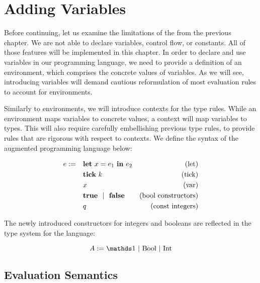 \chapter{Adding Variables}

Before continuing, let us examine the limitations of the  from the previous chapter. We are not able to declare variables, control flow, or constants. All of those features will be implemented in this chapter. In order to declare and use variables in our programming language, we need to provide a definition of an environment, which comprises the concrete values of variables. As we will see, introducing variables will demand cautious reformulation of most evaluation rules to account for environments.

Similarly to environments, we will introduce contexts for the type rules. While an environment maps variables to concrete values, a context will map variables to types. This will also require carefully embellishing previous type rules, to provide rules that are rigorous with respect to contexts. We define the syntax of the augmented programming language below:


\begin{definition}
   \label{def:prog-lang-5}

\begin{align*}
   e := ~~~ & \mathbf{let}~x = e_1~\mathbf{in}~e_2		& \text{(let)}\\
            & \mathbf{tick}~k				& \text{(tick)}\\
	    & x					& \text{(var)}\\
	    & \mathbf{true} ~~| ~~\mathbf{false}		& \text{(bool constructors)}\\
	    & q					& \text{(const integers)}\\
\end{align*}
\end{definition}

The newly introduced constructors for integers and booleans are reflected in the type system for the language:

\begin{definition}\label{def:type-system-5}
   \[
      A := \unit~|~\text{\bool}~|~\text{\typeint}
   \]
\end{definition}

\section{Evaluation Semantics}

